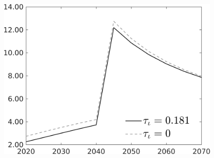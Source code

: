 \documentclass[12pt]{article}
\begin{document}
\begin{figure}[h!!]
\begin{minipage}[]{0.32\textwidth}
\end{minipage}	
\begin{minipage}[]{0.32\textwidth}
\includegraphics[width=1\textwidth]{../../codding_model/own_basedOnFried/optimalPol_010922_revision/figures/all_13Sept22/CompTauf_bytaul_Reg0_gAg_spillover0_nsk0_xgr0_knspil0_sep0_LFlimit1_emsbase0_countec0_GovRev0_etaa0.79_lgd1.png}
\end{minipage}	
\end{figure}
\end{document}
